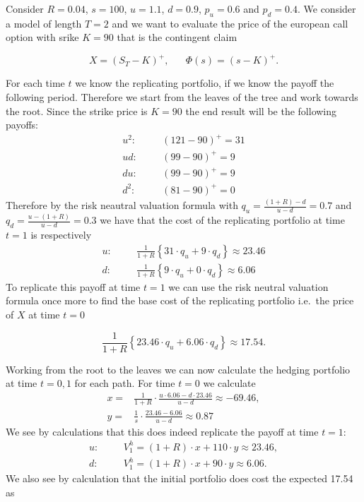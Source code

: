 \documentclass[a4paper,12pt,openany]{book}
\begin{document}
Consider \(R=0.04\), \(s=100\), \(u=1.1\), \(d=0.9\), \(p_u=0.6\) and \(p_d=0.4\). We consider a model of length \(T=2\) and we want to evaluate the price of the european call option with srike \(K=90\) that is the contingent claim

\[
X=(S_T-K)^+,\hspace{20pt}\Phi(s)=(s-K)^+.
\]

For each time \(t\) we know the replicating portfolio, if we know the payoff the following period. Therefore we start from the leaves of the tree and work towards the root. Since the strike price is \(K=90\) the end result will be the following payoffs:
\begin{align*}
u^2:\hspace{20pt}&(121-90)^+=31\\
ud:\hspace{20pt}&(99-90)^+=9\\
du:\hspace{20pt}&(99-90)^+=9\\
d^2:\hspace{20pt}&(81-90)^+=0
\end{align*}
Therefore by the risk neautral valuation formula with \(q_u=\frac{(1+R)-d}{u-d}=0.7\) and \(q_d=\frac{u-(1+R)}{u-d}=0.3\) we have that the cost of the replicating portfolio at time \(t=1\) is respectively
\begin{align*}
u:\hspace{20pt}&\frac{1}{1+R}\left\{31\cdot q_u + 9 \cdot q_d\right\}\approx 23.46\\
d:\hspace{20pt}&\frac{1}{1+R}\left\{9\cdot q_u + 0 \cdot q_d\right\}\approx 6.06
\end{align*}
To replicate this payoff at time \(t=1\) we can use the risk neutral valuation formula once more to find the base cost of the replicating portfolio i.e.~the price of \(X\) at time \(t=0\)

\[
\frac{1}{1+R}\left\{23.46\cdot q_u + 6.06 \cdot q_d\right\}\approx 17.54.
\]

Working from the root to the leaves we can now calculate the hedging portfolio at time \(t=0,1\) for each path. For time \(t=0\) we calculate
\begin{align*}
x=&\frac{1}{1+R}\cdot \frac{u\cdot 6.06-d\cdot 23.46}{u-d}\approx -69.46,\\
y=&\frac{1}{s}\cdot\frac{23.46-6.06}{u-d}\approx0.87
\end{align*}
We see by calculations that this does indeed replicate the payoff at time \(t=1\):
\begin{align*}
u:\hspace{20pt}&V_1^h=(1+R)\cdot x + 110\cdot y\approx 23.46,\\
d:\hspace{20pt}&V_1^h=(1+R)\cdot x + 90\cdot y\approx 6.06.
\end{align*}
We also see by calculation that the initial portfolio does cost the expected 17.54 as
\end{document}
